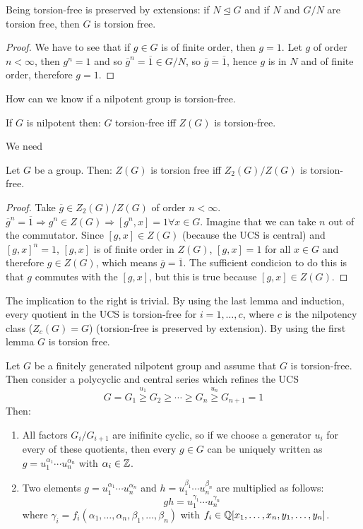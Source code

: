 \documentclass[twoside, 11pt]{article}
\begin{document}
\begin{lemma}
Being torsion-free is preserved by extensions: if $N\trianglelefteq G$ and if $N$ and $G/N$ are torsion free, then $G$ is torsion free.
\end{lemma}
\begin{proof}
We have to see that if $g\in G$ is of finite order, then $g=1$. Let $g$ of order $n<\infty$, then $g^n=1$ and so $\overline{g}^n=\overline{1}\in G/N$, so $\overline{g}=\overline{1}$, hence $g$ is in $N$ and of finite order, therefore $g=1$. 
\end{proof}

How can we know if a nilpotent group is torsion-free.

\begin{teorema}
If $G$ is nilpotent then: $G$ torsion-free iff $Z(G)$ is torsion-free.
\end{teorema}
We need
\begin{lemma}Let $G$ be a group. Then: $Z(G)$ is torsion free iff $Z_2(G)/Z(G)$ is torsion-free. 
\end{lemma}
\begin{proof}
Take $\overline{g}\in Z_2(G)/Z(G)$ of order $n<\infty$. $\overline{g}^n=\overline{1}\Rightarrow g^n\in Z(G)\Rightarrow [g^n,x]=1\forall x\in G$. Imagine that we can take $n$ out of the commutator. Since $[g,x]\in Z(G)$ (because the UCS is central) and $[g,x]^n=1$, $[g,x]$ is of finite order in $Z(G)$, $[g,x]=1$ for all $x\in G$ and therefore $g\in Z(G)$, which means $\overline{g}=\overline{1}$. The sufficient condicion to do this is that $g$ commutes with the $[g,x]$, but this is true because $[g,x]\in Z(G)$.
\end{proof}

\begin{dem}
The implication to the right is trivial. By using the last lemma and induction, every quotient in the UCS is torsion-free for $i=1,\dots, c$, where $c$ is the nilpotency class ($Z_c(G)=G$) (torsion-free is preserved by extension). By using the first lemma $G$ is torsion free.
\end{dem}

\begin{teorema}
Let $G$ be a finitely generated nilpotent group and assume that $G$ is torsion-free. Then consider a polycyclic and central series which refines the UCS
$$G=G_1\overset{u_1}{\geq} G_2\geq\cdots\geq G_n\overset{u_n}{\geq} G_{n+1}=1$$
Then:
\begin{enumerate}
\item All factors $G_i/G_{i+1}$ are inifinite cyclic, so if we choose a generator $u_i$ for every of these quotients, then every $g\in G$ can be uniquely written as $g=u_1^{\alpha_1}\cdots u_n^{\alpha_n}$ with $\alpha_i\in\mathbb{Z}$.
\item Two elements $g=u_1^{\alpha_1}\cdots u_n^{\alpha_n}$ and $h=u_1^{\beta_1}\cdots u_n^{\beta_n}$ are multiplied as follows:
$$gh=u_1^{\gamma_1}\cdots u_n^{\gamma_n}$$
where $\gamma_i=f_i(\alpha_1,\dots, \alpha_n,\beta_1,\dots,\beta_n)$ with $f_i\in\mathbb{Q}[x_1,\dots, x_n,y_1,\dots, y_n]$.
\end{enumerate}
\end{teorema}
\end{document}
